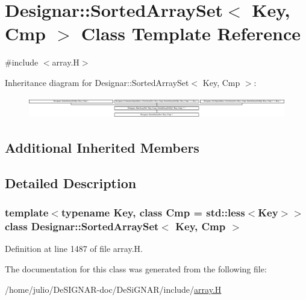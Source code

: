 \hypertarget{class_designar_1_1_sorted_array_set}{}\section{Designar\+:\+:Sorted\+Array\+Set$<$ Key, Cmp $>$ Class Template Reference}
\label{class_designar_1_1_sorted_array_set}


{\ttfamily \#include $<$array.\+H$>$}

Inheritance diagram for Designar\+:\+:Sorted\+Array\+Set$<$ Key, Cmp $>$\+:\begin{figure}[H]
\begin{center}
\leavevmode
\includegraphics[height=0.942761cm]{class_designar_1_1_sorted_array_set}
\end{center}
\end{figure}
\subsection*{Additional Inherited Members}


\subsection{Detailed Description}
\subsubsection*{template$<$typename Key, class Cmp = std\+::less$<$\+Key$>$$>$\newline
class Designar\+::\+Sorted\+Array\+Set$<$ Key, Cmp $>$}



Definition at line 1487 of file array.\+H.



The documentation for this class was generated from the following file\+:\begin{DoxyCompactItemize}
\item 
/home/julio/\+De\+S\+I\+G\+N\+A\+R-\/doc/\+De\+Si\+G\+N\+A\+R/include/\hyperlink{array_8_h}{array.\+H}\end{DoxyCompactItemize}
